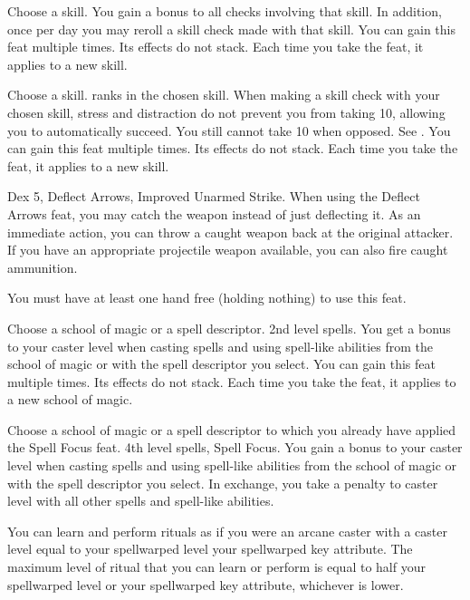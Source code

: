 Choose a skill.
 You gain a  bonus to all checks involving that skill. In addition, once per day you may reroll a skill check made with that skill.
 You can gain this feat multiple times. Its effects do not stack. Each time you take the feat, it applies to a new skill.

Choose a skill.
 ranks in the chosen skill.
\featben When making a skill check with your chosen skill, stress and distraction do not prevent you from taking 10, allowing you to automatically succeed. You still cannot take 10 when opposed. See .
 You can gain this feat multiple times. Its effects do not stack. Each time you take the feat, it applies to a new skill.

 Dex 5, Deflect Arrows, Improved Unarmed Strike.
 When using the Deflect Arrows feat, you may catch the weapon instead of just deflecting it. As an immediate action, you can throw a caught weapon back at the original attacker. If you have an appropriate projectile weapon available, you can also fire caught ammunition.
\par You must have at least one hand free (holding nothing) to use this feat.

Choose a school of magic or a spell descriptor.
 2nd level spells.
 You get a  bonus to your caster level when casting spells and using spell-like abilities from the school of magic or with the spell descriptor you select.
 You can gain this feat multiple times. Its effects do not stack. Each time you take the feat, it applies to a new school of magic.

Choose a school of magic or a spell descriptor to which you already have applied the Spell Focus feat.
\featpre 4th level spells, Spell Focus.
\featben You gain a  bonus to your caster level when casting spells and using spell-like abilities from the school of magic or with the spell descriptor you select. In exchange, you take a  penalty to caster level with all other spells and spell-like abilities.

\featben You can learn and perform rituals as if you were an arcane caster with a caster level equal to your spellwarped level \add your spellwarped key attribute. The maximum level of ritual that you can learn or perform is equal to half your spellwarped level or your spellwarped key attribute, whichever is lower.

